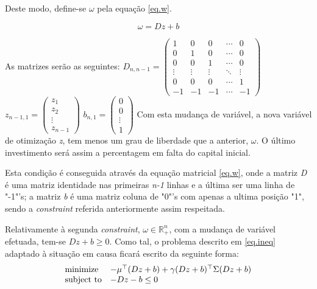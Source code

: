\documentclass[a4paper]{IEEEtran}
\begin{document}
Deste modo, define-se $\omega$ pela equação \ref{eq.w}. 

\begin{equation}
\label{eq.w}
\omega = D z + b
\end{equation}

As matrizes serão as seguintes:
\vskip 4mm
$D_{n,n-1} = 
 \begin{pmatrix}
  1 & 0 & 0 & \cdots & 0 \\
  0 & 1 & 0 & \cdots & 0 \\
  0 & 0 & 1 & \cdots & 0 \\
  \vdots & \vdots & \vdots & \ddots & \vdots \\
  0 & 0 & 0 & \cdots & 1 \\
  -1 & -1 &-1 & \cdots & -1
 \end{pmatrix}
$
\vskip 4mm
$z_{n-1,1} = 
\begin{pmatrix}
  z_{1} \\
  z_{2}\\
  \vdots  \\
  z_{n-1}  
 \end{pmatrix}
$ \: \: \: \: \: \: \:
$
b_{n,1} = 
\begin{pmatrix}
  0 \\
  0\\
  \vdots  \\
  1  
 \end{pmatrix}
$
\vskip 4mm
Com esta mudança de variável, a nova variável de otimização \textit{z}, tem menos um grau de liberdade que a anterior, $\omega$. O último investimento será assim a percentagem em falta do capital inicial. 

Esta condição é conseguida através da equação matricial \ref{eq.w}, onde a matriz \textit{D} é uma matriz identidade nas primeiras \textit{n-1} linhas e a última ser uma linha de "-1"'s; a matriz \textit{b} é uma matriz coluna de "0"'s com  apenas a ultima posição "1", sendo a \textit{constraint} referida anteriormente assim respeitada.

Relativamente à segunda \textit{constraint}, $\omega \in \mathbb{R}_+^n$, com a mudança de variável efetuada, tem-se $D z + b \geq 0$. Como tal, o problema descrito em \ref{eq.ineq} adaptado à situação em causa ficará escrito da seguinte forma:
\begin{equation}
\label{subs}
\begin{array}[t]{ll} \text{minimize} & -\mu^\top (D z + b) + \gamma (D z + b)^\top \Sigma (D z + b) \\
\text{subject to} & -D z - b \leq 0 \end{array}
\end{equation}
\end{document}
